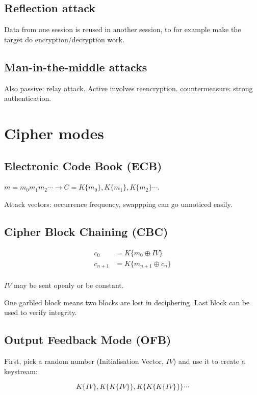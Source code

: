 \documentclass{article}
\begin{document}
\subsection{Reflection attack}

Data from one session is reused in another session, to for example make the
target do encryption/decryption work.

\subsection{Man-in-the-middle attacks}

Also passive: relay attack. Active involves reencryption. countermeasure:
strong authentication.

\section{Cipher modes}

\subsection{Electronic Code Book (ECB)}
$m = m_0m_1m_2\cdots \rightarrow C = K\{m_0\},K\{m_1\},K\{m_2\}\cdots$.

Attack vectors: occurrence frequency, swappping can go unnoticed easily.

\subsection{Cipher Block Chaining (CBC)}

\begin{align*}
  c_0     &= K\{m_0 \oplus IV\} \\
  c_{n+1} &= K\{m_{n+1} \oplus c_n\} \\
\end{align*}

$IV$ may be sent openly or be constant.

One garbled block means two blocks are lost in deciphering. Last block
can be used to verify integrity.

\subsection{Output Feedback Mode (OFB)}

First, pick a random number (Initialisation Vector, $IV$) and use it to
create a keystream:

\[ K\{IV\},K\{K\{IV\}\}, K\{K\{K\{IV\}\}\} \cdots \]
\end{document}
